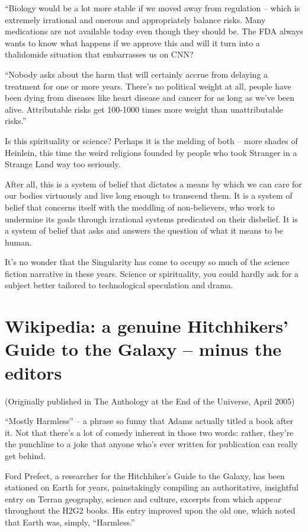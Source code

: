 ``Biology would be a lot more stable if we moved away from
regulation -- which is extremely irrational and onerous and 
appropriately balance risks. Many medications are not available
today even though they should be. The FDA always wants to know what
happens if we approve this and will it turn into a thalidomide
situation that embarrasses us on CNN?

``Nobody asks about the harm that will certainly accrue from
delaying a treatment for one or more years. There's no political
weight at all, people have been dying from diseases like heart
disease and cancer for as long as we've been alive. Attributable
risks get 100-1000 times more weight than unattributable risks.''

Is this spirituality or science? Perhaps it is the melding of both
-- more shades of Heinlein, this time the weird religions founded
by people who took Stranger in a Strange Land way too seriously.

After all, this is a system of belief that dictates a means by
which we can care for our bodies virtuously and live long enough to
transcend them. It is a system of belief that concerns itself with
the meddling of non-believers, who work to undermine its goals
through irrational systems predicated on their disbelief. It is a
system of belief that asks and answers the question of what it
means to be human.

It's no wonder that the Singularity has come to occupy so much of
the science fiction narrative in these years. Science or
spirituality, you could hardly ask for a subject better tailored to
technological speculation and drama.

\section{Wikipedia: a genuine Hitchhikers' Guide to the Galaxy -- minus the editors}

(Originally published in The Anthology at the End of the Universe,
April 2005)

``Mostly Harmless'' -- a phrase so funny that Adams actually titled a
book after it. Not that there's a lot of comedy inherent in those
two words: rather, they're the punchline to a joke that anyone
who's ever written for publication can really get behind.

Ford Prefect, a researcher for the Hitchhiker's Guide to the
Galaxy, has been stationed on Earth for years, painstakingly
compiling an authoritative, insightful entry on Terran geography,
science and culture, excerpts from which appear throughout the H2G2
books. His entry improved upon the old one, which noted that Earth
was, simply, ``Harmless.''

